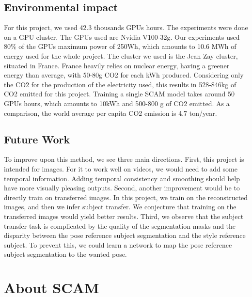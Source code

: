 \documentclass[runningheads]{llncs}
\begin{document}
\subsection{Environmental impact}
For this project, we used 42.3 thousands GPUs hours. The experiments were done on a GPU cluster. The GPUs used are Nvidia V100-32g. Our experiments used 80\% of the GPUs maximum power of 250Wh, which amounts to 10.6 MWh of energy used for the whole project. The cluster we used is the Jean Zay cluster, situated in France. France heavily relies on nuclear energy, having a greener energy than average, with 50-80g CO2 for each kWh produced. Considering only the CO2 for the production of the electricity used, this results in 528-846kg of CO2 emitted for this project. Training a single SCAM model takes around 50 GPUs hours, which amounts to 10kWh and 500-800 g of CO2 emitted. As a comparison, the world average per capita CO2 emission is 4.7 ton/year.
\subsection{Future Work}
To improve upon this method, we see three main directions. First, this project is intended for images. For it to work well on videos, we would need to add some temporal information. Adding temporal consistency and smoothing should help have more visually pleasing outputs. Second, another improvement would be to directly train on transferred images. In this project, we train on the reconstructed images, and then we infer subject transfer. We conjecture that training on the transferred images would yield better results. Third, we observe that the subject transfer task is complicated by the quality of the segmentation masks and the disparity between the pose reference subject segmentation and the style reference subject. To prevent this, we could learn a network to map the pose reference subject segmentation to the wanted pose.


\section{About SCAM}
\label{sup:sec:about}
\end{document}
